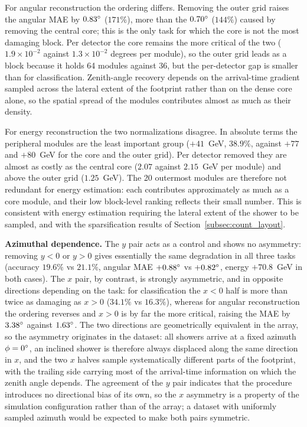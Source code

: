 For angular reconstruction the ordering differs. Removing the outer grid raises the angular MAE by $0.83\degree$ ($171\%$), more than the $0.70\degree$ ($144\%$) caused by removing the central core; this is the only task for which the core is not the most damaging block. Per detector the core remains the more critical of the two ($1.9 \times 10^{-2}$ against $1.3 \times 10^{-2}$ degrees per module), so the outer grid leads as a block because it holds 64 modules against 36, but the per-detector gap is smaller than for classification. Zenith-angle recovery depends on the arrival-time gradient sampled across the lateral extent of the footprint rather than on the dense core alone, so the spatial spread of the modules contributes almost as much as their density.

For energy reconstruction the two normalizations disagree. In absolute terms the peripheral modules are the least important group ($+41$~GeV, $38.9\%$, against $+77$ and $+80$~GeV for the core and the outer grid). Per detector removed they are almost as costly as the central core ($2.07$ against $2.15$~GeV per module) and above the outer grid ($1.25$~GeV). The 20 outermost modules are therefore not redundant for energy estimation: each contributes approximately as much as a core module, and their low block-level ranking reflects their small number. This is consistent with energy estimation requiring the lateral extent of the shower to be sampled, and with the sparsification results of Section~\ref{subsec:count_layout}.

\textbf{Azimuthal dependence.} The $y$ pair acts as a control and shows no asymmetry: removing $y<0$ or $y>0$ gives essentially the same degradation in all three tasks (accuracy $19.6\%$ vs $21.1\%$, angular MAE $+0.88\degree$ vs $+0.82\degree$, energy $+70.8$~GeV in both cases). The $x$ pair, by contrast, is strongly asymmetric, and in opposite directions depending on the task: for classification the $x<0$ half is more than twice as damaging as $x>0$ ($34.1\%$ vs $16.3\%$), whereas for angular reconstruction the ordering reverses and $x>0$ is by far the more critical, raising the MAE by $3.38\degree$ against $1.63\degree$. The two directions are geometrically equivalent in the array, so the asymmetry originates in the dataset: all showers arrive at a fixed azimuth $\phi = 0\degree$, an inclined shower is therefore always displaced along the same direction in $x$, and the two $x$ halves sample systematically different parts of the footprint, with the trailing side carrying most of the arrival-time information on which the zenith angle depends. The agreement of the $y$ pair indicates that the procedure introduces no directional bias of its own, so the $x$ asymmetry is a property of the simulation configuration rather than of the array; a dataset with uniformly sampled azimuth would be expected to make both pairs symmetric.

